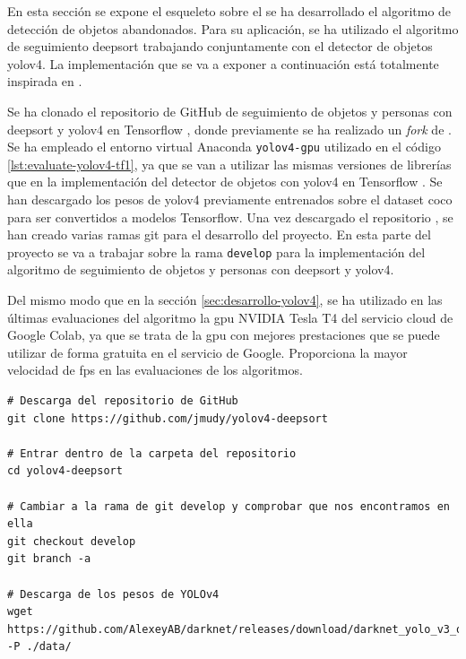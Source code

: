 En esta sección se expone el esqueleto sobre el se ha desarrollado el algoritmo de detección de objetos abandonados. Para su aplicación, se ha utilizado el algoritmo de seguimiento \gls{deepsort} trabajando conjuntamente con el detector de objetos \gls{yolov4}. La implementación que se va a exponer a continuación está totalmente inspirada en \cite{yolov4-deepsort-original}.

Se ha clonado el repositorio de GitHub de seguimiento de objetos y personas con \gls{deepsort} y \gls{yolov4} en Tensorflow \cite{yolov4-deepsort}, donde previamente se ha realizado un \textit{fork} de \cite{yolov4-deepsort-original}. Se ha empleado el entorno virtual Anaconda \texttt{yolov4-gpu} utilizado en el código \ref{lst:evaluate-yolov4-tf1}, ya que se van a utilizar las mismas versiones de librerías que en la implementación del detector de objetos con \gls{yolov4} en Tensorflow \cite{yolov4-tf-github}. Se han descargado los pesos de \gls{yolov4} previamente entrenados sobre el dataset \gls{coco} para ser convertidos a modelos Tensorflow. Una vez descargado el repositorio \cite{yolov4-deepsort}, se han creado varias ramas git para el desarrollo del proyecto. En esta parte del proyecto se va a trabajar sobre la rama \texttt{develop} para la implementación del algoritmo de seguimiento de objetos y personas con \gls{deepsort} y \gls{yolov4}.

Del mismo modo que en la sección \ref{sec:desarrollo-yolov4}, se ha utilizado en las últimas evaluaciones del algoritmo la \gls{gpu} NVIDIA Tesla T4 del servicio cloud de Google Colab, ya que se trata de la \gls{gpu} con mejores prestaciones que se puede utilizar de forma gratuita en el servicio de Google. Proporciona la mayor velocidad de \gls{fps} en las evaluaciones de los algoritmos.

\vspace{0.5cm}
\begin{lstlisting}[language=iPython,caption=Evaluación del seguimiento de objetos Deep SORT y YOLOv4 en Tensorflow (1),captionpos=b,label={lst:evaluate-deepsort-tf1}]
# Descarga del repositorio de GitHub
git clone https://github.com/jmudy/yolov4-deepsort

# Entrar dentro de la carpeta del repositorio
cd yolov4-deepsort

# Cambiar a la rama de git develop y comprobar que nos encontramos en ella
git checkout develop
git branch -a

# Descarga de los pesos de YOLOv4
wget https://github.com/AlexeyAB/darknet/releases/download/darknet_yolo_v3_optimal/yolov4.weights -P ./data/
\end{lstlisting}

